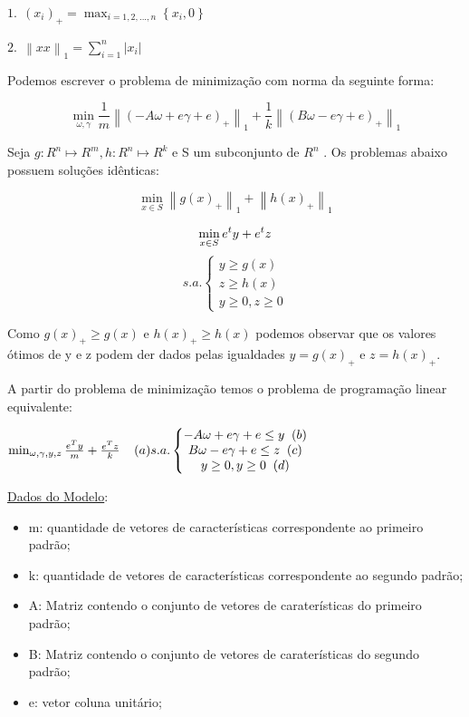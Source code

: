 $1.\ \ (x_{i})_{+} = \max_{i=1,2,...,n}{\left \{x_{i},0  \right \}}$

$2.\ \ \left \| xx \right \|_{1} = \sum_{i=1}^{n}\left | x_{i} \right |$

Podemos escrever o problema de minimização com norma da seguinte forma:

$$\min_{\omega ,\gamma }\frac{1}{m}\left \| \left ( -A\omega + e\gamma  + e \right )_{+} \right \|_{1} + \frac{1}{k}\left \| \left ( B\omega - e\gamma + e  \right )_{+} \right \|_{1}$$

Seja $g:R^{n} \mapsto R^{m} , h:R^{n} \mapsto R^{k}$ e S um subconjunto de $R^{n}$ . Os problemas abaixo possuem soluções idênticas:

$$\min_{x\in S}\left \| g(x)_{+} \right \|_{1} + \left \| h(x)_{+} \right \|_{1}$$


$$\min_{x\in S} e^{t}y + e^{t}z\\$$
$$ s.a.\left\{\begin{matrix}y\geq g(x)\\ z\geq h(x)\\ y\geq 0, z\geq0\end{matrix}\right.$$

Como $g(x)_{+}\geq g(x)$ e $h(x)_{+}\geq h(x)$ podemos observar que os valores ótimos de y e z podem der dados pelas igualdades $y=g(x)_{+}$ e $z=h(x)_{+}$.

A partir do problema de minimização temos o problema de programação linear equivalente:

$\min_{\omega ,\gamma ,y,z}\frac{e^{T}y}{m}+\frac{e^{T}z}{k} \; \; \; \; (a)\\
s.a.\left\{\begin{matrix}-A\omega +e\gamma+e\leq y\; \; (b)\\B\omega -e\gamma+e\leq  z\; \; (c)\\ y\geq 0,y\geq 0\; \; (d)\end{matrix}\right.$

\underline{Dados do Modelo}:
\begin{itemize}
\item{m}: quantidade de vetores de características correspondente ao primeiro padrão;
\item{k}: quantidade de vetores de características correspondente ao segundo padrão;
\item{A}: Matriz contendo o conjunto de vetores de caraterísticas do primeiro padrão;
\item{B}: Matriz contendo o conjunto de vetores de caraterísticas do segundo padrão;
\item{e}: vetor coluna unitário;
\end{itemize}

